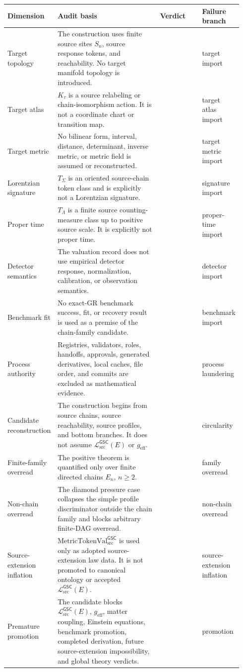 \documentclass[11pt]{article}
\newcommand{\MetricTokenVal}{\mathrm{MetricTokenVal}_{\mathrm{src}}^{\mathsf{GSC}}}
\newcommand{\MetricData}{\mathcal{L}_{\mathrm{src}}^{\mathsf{GSC}}}
\newcommand{\geff}{g_{\mathrm{eff}}}
\newcommand{\En}{E_n}
\newcommand{\Pass}{\mathrm{pass\_no\_smuggling\_detected}}
\begin{document}
\begin{longtable}{p{0.19\linewidth}p{0.44\linewidth}p{0.18\linewidth}p{0.13\linewidth}}
\toprule
Dimension & Audit basis & Verdict & Failure branch \\
\midrule
Target topology &
The construction uses finite source sites \(S_n\), source response tokens,
and reachability. No target manifold topology is introduced. &
\Pass &
target import \\
Target atlas &
\(K_{\tau}\) is a source relabeling or chain-isomorphism action. It is not a
coordinate chart or transition map. &
\Pass &
target atlas import \\
Target metric &
No bilinear form, interval, distance, determinant, inverse metric, or metric
field is assumed or reconstructed. &
\Pass &
target metric import \\
Lorentzian signature &
\(T_{\Sigma}\) is an oriented source-chain token class and is explicitly not
a Lorentzian signature. &
\Pass &
signature import \\
Proper time &
\(T_{\Lambda}\) is a finite source counting-measure class up to positive
source scale. It is explicitly not proper time. &
\Pass &
proper-time import \\
Detector semantics &
The valuation record does not use empirical detector response,
normalization, calibration, or observation semantics. &
\Pass &
detector import \\
Benchmark fit &
No exact-GR benchmark success, fit, or recovery result is used as a premise
of the chain-family candidate. &
\Pass &
benchmark import \\
Process authority &
Registries, validators, roles, handoffs, approvals, generated derivatives,
local caches, file order, and commits are excluded as mathematical evidence. &
\Pass &
process laundering \\
Candidate reconstruction &
The construction begins from source chains, source reachability, source
profiles, and bottom branches. It does not assume \(\MetricData(E)\) or
\(\geff\). &
\Pass &
circularity \\
Finite-family overread &
The positive theorem is quantified only over finite directed chains
\(\En\), \(n\ge 2\). &
\Pass &
family overread \\
Non-chain overread &
The diamond pressure case collapses the simple profile discriminator outside
the chain family and blocks arbitrary finite-DAG overread. &
\Pass &
non-chain overread \\
Source-extension inflation &
\(\MetricTokenVal\) is used only as adopted source-extension law data. It is
not promoted to canonical ontology or accepted \(\MetricData(E)\). &
\Pass &
source-extension inflation \\
Premature promotion &
The candidate blocks \(\MetricData(E)\), \(\geff\), matter coupling,
Einstein equations, benchmark promotion, completed derivation, future
source-extension impossibility, and global theory verdicts. &
\Pass &
promotion \\
\bottomrule
\end{longtable}
\end{document}
